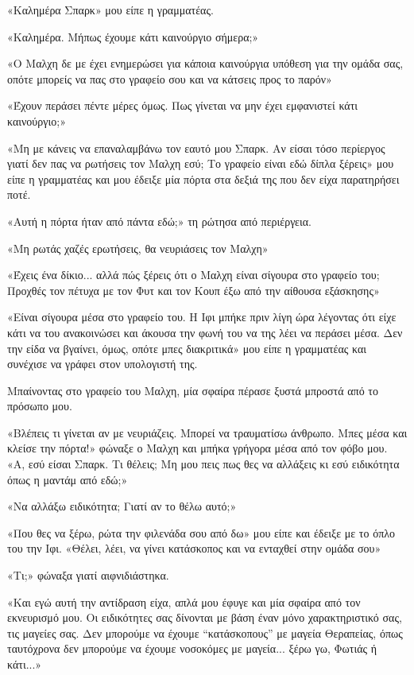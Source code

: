 \documentclass[12pt,twoside, openany]{book}
\begin{document}
«Καλημέρα Σπαρκ» μου είπε η γραμματέας.

«Καλημέρα. Μήπως έχουμε κάτι καινούργιο σήμερα;»

«Ο Μαλχη δε με έχει ενημερώσει για κάποια καινούργια υπόθεση για την ομάδα σας, οπότε μπορείς να πας στο γραφείο σου και να κάτσεις προς το παρόν»

«Έχουν περάσει πέντε μέρες όμως. Πως γίνεται να μην έχει εμφανιστεί κάτι καινούργιο;»

«Μη με κάνεις να επαναλαμβάνω τον εαυτό μου Σπαρκ. Αν είσαι τόσο περίεργος γιατί δεν πας να ρωτήσεις τον Μαλχη εσύ; Το γραφείο είναι εδώ δίπλα ξέρεις» μου είπε η γραμματέας και μου έδειξε μία πόρτα στα δεξιά της που δεν είχα παρατηρήσει ποτέ.

«Αυτή η πόρτα ήταν από πάντα εδώ;» τη ρώτησα από περιέργεια.

«Μη ρωτάς χαζές ερωτήσεις, θα νευριάσεις τον Μαλχη»

«Έχεις ένα δίκιο... αλλά πώς ξέρεις ότι ο Μαλχη είναι σίγουρα στο γραφείο του; Προχθές τον πέτυχα με τον Φυτ και τον Κουπ έξω από την αίθουσα εξάσκησης»

«Είναι σίγουρα μέσα στο γραφείο του. Η Ιφι μπήκε πριν λίγη ώρα λέγοντας ότι είχε κάτι να του ανακοινώσει και άκουσα την φωνή του να της λέει να περάσει μέσα. Δεν την είδα να βγαίνει, όμως, οπότε μπες διακριτικά» μου είπε η γραμματέας και συνέχισε να γράφει στον υπολογιστή της.

Μπαίνοντας στο γραφείο του Μαλχη, μία σφαίρα πέρασε ξυστά μπροστά από το πρόσωπο μου.

«Βλέπεις τι γίνεται αν με νευριάζεις. Μπορεί να τραυματίσω άνθρωπο. Μπες μέσα και κλείσε την πόρτα!» φώναξε ο Μαλχη και μπήκα γρήγορα μέσα από τον φόβο μου. «Α, εσύ είσαι Σπαρκ. Τι θέλεις; Μη μου πεις πως θες να αλλάξεις κι εσύ ειδικότητα όπως η μαντάμ από εδώ;»

«Να αλλάξω ειδικότητα; Γιατί αν το θέλω αυτό;»

«Που θες να ξέρω, ρώτα την φιλενάδα σου από δω» μου είπε και έδειξε με το όπλο του την Ιφι. «Θέλει, λέει, να γίνει κατάσκοπος και να ενταχθεί στην ομάδα σου»

«Τι;» φώναξα γιατί αιφνιδιάστηκα.

«Και εγώ αυτή την αντίδραση είχα, απλά μου έφυγε και μία σφαίρα από τον εκνευρισμό μου. Οι ειδικότητες σας δίνονται με βάση έναν μόνο χαρακτηριστικό σας, τις μαγείες σας. Δεν μπορούμε να έχουμε “κατάσκοπους” με μαγεία Θεραπείας, όπως ταυτόχρονα δεν μπορούμε να έχουμε νοσοκόμες με μαγεία... ξέρω γω, Φωτιάς ή κάτι...»
\end{document}
